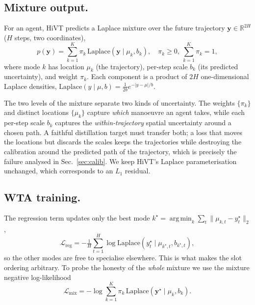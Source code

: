 \documentclass[conference]{IEEEtran}
\newcommand{\R}{\mathbb{R}}
\newcommand{\Lap}{\mathrm{Laplace}}
\newcommand{\loc}{\mu}
\newcommand{\scale}{b}
\DeclareMathOperator*{\argmin}{arg\,min}
\begin{document}
\subsection{Mixture output.} For an agent, HiVT predicts a Laplace mixture over the
future trajectory $\mathbf{y}\in\R^{2H}$ ($H$ steps, two coordinates),
\begin{equation}
  \label{eq:mixture}
  p(\mathbf{y}) = \sum_{k=1}^{K} \pi_k\,\Lap\!\left(\mathbf{y}\mid \loc_k,\scale_k\right),
  \quad \pi_k\ge 0,\ \textstyle\sum_{k=1}^{K} \pi_k = 1,
\end{equation}
where mode $k$ has location $\loc_k$ (the trajectory), per-step scale $\scale_k$
(its predicted uncertainty), and weight $\pi_k$. Each component is a product of
$2H$ one-dimensional Laplace densities, $\Lap(y\mid\mu,b)=\tfrac{1}{2b}e^{-|y-\mu|/b}$.

The two levels of the mixture separate two kinds of uncertainty. The weights
$\{\pi_k\}$ and distinct locations $\{\loc_k\}$ capture \emph{which} manoeuvre an
agent takes, while each per-step scale $\scale_k$ captures
the \emph{within-trajectory} spatial uncertainty around a chosen path. A faithful
distillation target must transfer both; a loss that moves the locations but discards
the scales keeps the trajectories while destroying the calibration around the 
predicted path of the trajectory, which is precisely the failure analysed 
in Sec.~\ref{sec:calib}. 
We keep HiVT's Laplace parameterisation unchanged, which corresponds 
to an $L_1$ residual.

\subsection{WTA training.} The regression term updates only the best mode
$k^\star=\argmin_k \sum_t\lVert\loc_{k,t}-y^\star_t\rVert_2$,
\begin{equation}
  \label{eq:reg}
  \mathcal{L}_{\mathrm{reg}} = -\tfrac{1}{H}\textstyle\sum_{t=1}^{H}
    \log\Lap\!\left(y^\star_t\mid \loc_{k^\star,t},\scale_{k^\star,t}\right),
\end{equation}
so the other modes are free to specialise elsewhere. This is what makes the slot
ordering arbitrary. To probe the honesty of the \emph{whole} mixture we use the
mixture negative log-likelihood
\begin{equation}
  \label{eq:mixnll}
  \mathcal{L}_{\mathrm{mix}} = -\log\textstyle\sum_{k=1}^{K}\pi_k\,
    \Lap\!\left(\mathbf{y}^\star\mid\loc_k,\scale_k\right).
\end{equation}
\end{document}
